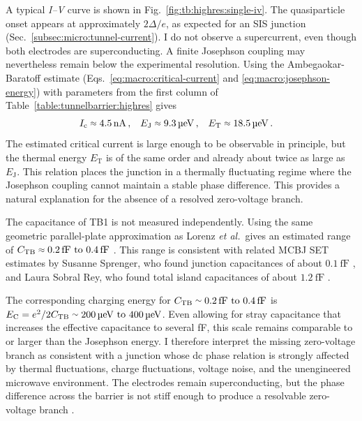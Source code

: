     A typical \textit{I--V} curve is shown in Fig.~\ref{fig:tb:highres:single-iv}. The quasiparticle onset appears at approximately $2\Delta/e$, as expected for an SIS junction (Sec.~\ref{subsec:micro:tunnel-current}). I do not observe a supercurrent, even though both electrodes are superconducting. A finite Josephson coupling may nevertheless remain below the experimental resolution. Using the Ambegaokar-Baratoff estimate (Eqs.~\ref{eq:macro:critical-current} and \ref{eq:macro:josephson-energy}) with parameters from the first column of Table~\ref{table:tunnelbarrier:highres} gives
    \begin{align}
        I_\mathrm{c} &\sapprox \qty{4.5}{\nano\ampere}\,, &
        E_\mathrm{J} &\sapprox \qty{9.3}{\micro\electronvolt}\,, &
        E_\mathrm{T} &\sapprox \qty{18.5}{\micro\electronvolt}\,.
        \label{eq:tb:highres:josephson-estimate}
    \end{align}
    The estimated critical current is large enough to be observable in principle, but the thermal energy $E_\mathrm{T}$ is of the same order and already about twice as large as $E_\mathrm{J}$.
    This relation places the junction in a thermally fluctuating regime where the Josephson coupling cannot maintain a stable phase difference. This provides a natural explanation for the absence of a resolved zero-voltage branch.
    

    The capacitance of TB1 is not measured independently. Using the same geometric parallel-plate approximation as Lorenz \textit{et al.}~gives an estimated range of $C_\mathrm{TB}\sapprox\qtyrange{0.2}{0.4}{\femto\farad}$ \cite{lorenz_sset_mar_2018,lorenz_wechselspiel_2018}. This range is consistent with related MCBJ SET estimates by Susanne Sprenger, who found junction capacitances of about $\qty{0.1}{\femto\farad}$ \cite{sprenger_interplay_2019}, and Laura Sobral Rey, who found total island capacitances of about $\qty{1.2}{\femto\farad}$ \cite{sobral_rey_interplay_2022,sobral_rey_hybrid_sset_2024}.

    The corresponding charging energy for $C_\mathrm{TB}\ssim\qtyrange{0.2}{0.4}{\femto\farad}$ is $E_\mathrm{C}=e^2/2C_\mathrm{TB}\ssim\qtyrange{200}{400}{\micro\electronvolt}$. Even allowing for stray capacitance that increases the effective capacitance to several fF, this scale remains comparable to or larger than the Josephson energy. I therefore interpret the missing zero-voltage branch as consistent with a junction whose dc phase relation is strongly affected by thermal fluctuations, charge fluctuations, voltage noise, and the unengineered microwave environment. The electrodes remain superconducting, but the phase difference across the barrier is not stiff enough to produce a resolvable zero-voltage branch \cite{ambegaokar_tunneling_1963,tinkham_introduction_2004,grabert_single_2013}.

